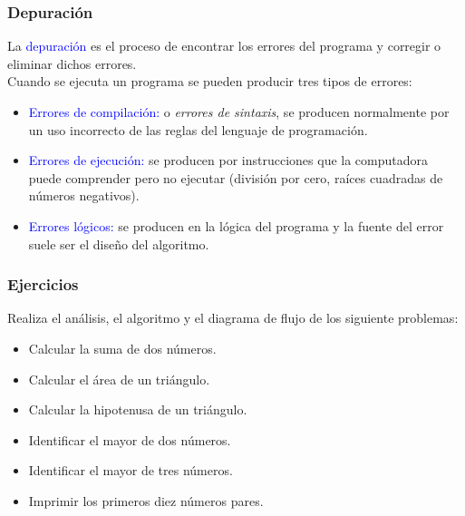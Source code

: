 \begin{frame}[t]
\frametitle{Depuración}
La \textcolor{blue}{depuración} es el proceso de encontrar los errores del programa y corregir o eliminar dichos errores.\\
Cuando se ejecuta un programa se pueden producir tres tipos de errores:
\begin{itemize}
    \item \textcolor{blue}{Errores de compilación:} o \textit{errores de sintaxis}, se producen normalmente por un uso incorrecto de las reglas del lenguaje de programación. \pause
    \item \textcolor{blue}{Errores de ejecución:} se producen por instrucciones que la computadora puede comprender pero no ejecutar (división por cero, raíces cuadradas de números negativos). \pause
    \item \textcolor{blue}{Errores lógicos:} se producen en la lógica del programa y la fuente del error suele ser el diseño del algoritmo.
\end{itemize}
\end{frame}


\begin{frame}[t]
\frametitle{Ejercicios}
Realiza el análisis, el algoritmo y el diagrama de flujo de los siguiente problemas:
\begin{itemize}
    \item Calcular la suma de dos números.
    \item Calcular el área de un triángulo.
    \item Calcular la hipotenusa de un triángulo.
    \item Identificar el mayor de dos números.
    \item Identificar el mayor de tres números.
    \item Imprimir los primeros diez números pares.
\end{itemize}
\end{frame}






